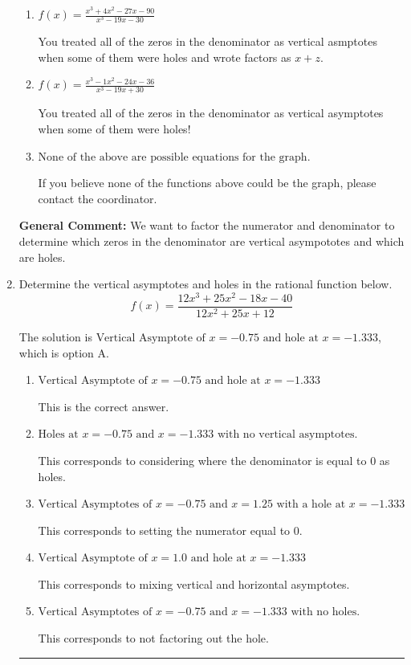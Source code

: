 \documentclass{extbook}[14pt]
\newcommand{\litem}[1]{\item #1

\rule{\textwidth}{0.4pt}}
\begin{document}
\begin{enumerate}
{\begin{enumerate}[label=\Alph*.]
This is the correct answer!
\item \( f(x)=\frac{x^{3} +4 x^{2} -27 x -90}{x^{3} -19 x -30} \)

You treated all of the zeros in the denominator as vertical asmptotes when some of them were holes and wrote factors as $x+z$.
\item \( f(x)=\frac{x^{3} -1 x^{2} -24 x -36}{x^{3} -19 x + 30} \)

You treated all of the zeros in the denominator as vertical asymptotes when some of them were holes!
\item \( \text{None of the above are possible equations for the graph.} \)

If you believe none of the functions above could be the graph, please contact the coordinator.
\end{enumerate}

\textbf{General Comment:} We want to factor the numerator and denominator to determine which zeros in the denominator are vertical asympototes and which are holes.
}
\litem{
Determine the vertical asymptotes and holes in the rational function below.
\[ f(x) = \frac{12x^{3} +25 x^{2} -18 x -40}{12x^{2} +25 x + 12} \]

The solution is \( \text{Vertical Asymptote of } x = -0.75 \text{ and hole at } x = -1.333 \), which is option A.\begin{enumerate}[label=\Alph*.]
\item \( \text{Vertical Asymptote of } x = -0.75 \text{ and hole at } x = -1.333 \)

This is the correct answer.
\item \( \text{Holes at } x = -0.75 \text{ and } x = -1.333 \text{ with no vertical asymptotes.} \)

This corresponds to considering where the denominator is equal to 0 as holes.
\item \( \text{Vertical Asymptotes of } x = -0.75 \text{ and } x = 1.25 \text{ with a hole at } x = -1.333 \)

This corresponds to setting the numerator equal to 0.
\item \( \text{Vertical Asymptote of } x = 1.0 \text{ and hole at } x = -1.333 \)

This corresponds to mixing vertical and horizontal asymptotes.
\item \( \text{Vertical Asymptotes of } x = -0.75 \text{ and } x = -1.333 \text{ with no holes.} \)

This corresponds to not factoring out the hole.
\end{enumerate}

}
\end{enumerate}
\end{document}
